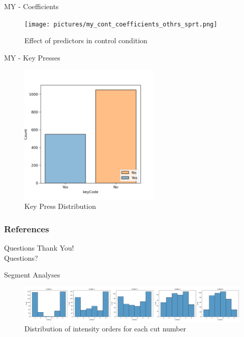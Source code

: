 \documentclass[10pt,xcolor=svgnames]{beamer} %
\begin{document}
\begin{frame}{MY - Coefficients}
    \begin{figure}
        \hspace*{-1cm} 
        \centering
        \texttt{[image: pictures/my\_cont\_coefficients\_othrs\_sprt.png]}
        \caption{Effect of predictors in control condition}
        \label{fig:my_cont_coeffs}
    \end{figure}    
\end{frame}

\begin{frame}{MY - Key Presses}
    \begin{figure}
        \centering
        \includegraphics[width = 0.6\textwidth]{pictures/my_key_press_dist.png}
        \caption{Key Press Distribution}
        \label{fig:my_key_press}
    \end{figure}    
\end{frame}


\begin{frame}
\frametitle{References}
    \printbibliography
\end{frame}

\begin{frame}{Questions}
    \centering
    \huge Thank You! \\
    \huge Questions?
\end{frame}



\begin{frame}{Segment Analyses}
    \begin{figure}
        \hspace*{-0.8cm}
        \centering
        \includegraphics[width = 1.1\textwidth]{pictures/intensity_order.png}
        \caption{Distribution of intensity orders for each cut number}
        \label{fig:intensity_order}
    \end{figure}
\end{frame}
\end{document}
